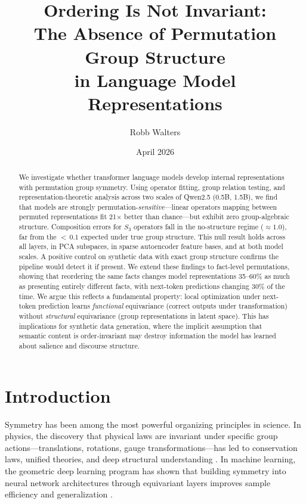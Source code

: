 \documentclass[10pt, letterpaper]{article}
\title{Ordering Is Not Invariant:\\ The Absence of Permutation Group Structure\\ in Language Model Representations}
\author{Robb Walters}
\date{April 2026}
\begin{document}
\maketitle

\begin{abstract}
We investigate whether transformer language models develop internal representations with permutation group symmetry. Using operator fitting, group relation testing, and representation-theoretic analysis across two scales of Qwen2.5 (0.5B, 1.5B), we find that models are strongly permutation-\emph{sensitive}---linear operators mapping between permuted representations fit 21$\times$ better than chance---but exhibit zero group-algebraic structure. Composition errors for $S_3$ operators fall in the no-structure regime ($\approx 1.0$), far from the ${<}\,0.1$ expected under true group structure. This null result holds across all layers, in PCA subspaces, in sparse autoencoder feature bases, and at both model scales. A positive control on synthetic data with exact group structure confirms the pipeline would detect it if present. We extend these findings to fact-level permutations, showing that reordering the same facts changes model representations 35--60\% as much as presenting entirely different facts, with next-token predictions changing 30\% of the time. We argue this reflects a fundamental property: local optimization under next-token prediction learns \emph{functional} equivariance (correct outputs under transformation) without \emph{structural} equivariance (group representations in latent space). This has implications for synthetic data generation, where the implicit assumption that semantic content is order-invariant may destroy information the model has learned about salience and discourse structure.
\end{abstract}

\section{Introduction}
\label{sec:intro}

Symmetry has been among the most powerful organizing principles in science. In physics, the discovery that physical laws are invariant under specific group actions---translations, rotations, gauge transformations---has led to conservation laws, unified theories, and deep structural understanding \cite{noether1918, weyl1952}. In machine learning, the geometric deep learning program has shown that building symmetry into neural network architectures through equivariant layers improves sample efficiency and generalization \cite{bronstein2021geometric, cohen2016group}.
\end{document}
